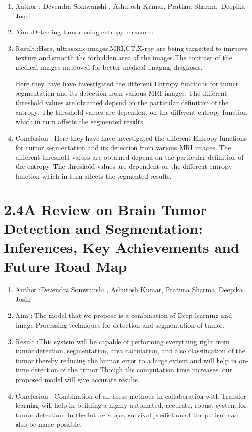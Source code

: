 \documentclass[oneside,a4paper,12pt]{book}
\begin{document}
\begin{enumerate}

\item Author : Devendra Somwanshi , Ashutosh Kumar, Pratima Sharma, Deepika Joshi

\item Aim :Detecting tumor using entropy measures
\item Result :Here, ultrasonic images,MRI,CT,X-ray are being targetted to imrpove texture and smooth the forbidden area of the images.The contrast of the medical images improved for better medical imaging diagnosis.\par Here they have have investigated the different Entropy functions for tumor segmentation and its detection from various MRI images. The different threshold values are obtained depend on the particular definition of the entropy. The threshold values are dependent on the different entropy function which in turn affects the segmented results.

\item Conclusion :  
Here they have have investigated the different Entropy functions for tumor segmentation and its detection from various MRI images. The different threshold values are obtained depend on the particular definition of the entropy. The threshold values are dependent on the different entropy function which in turn affects the segmented results.
\end{enumerate}

\newpage
\vspace{\baselineskip}\section*{2.4\hspace*{10pt}A Review on Brain Tumor Detection and Segmentation: Inferences, Key Achievements and Future Road Map }
\begin{enumerate}

\item Author :Devendra Somwanshi , Ashutosh Kumar, Pratima Sharma, Deepika Joshi
\item Aim : The model that we propose is a combination of Deep
learning and Image Processing techniques for detection
and segmentation of tumor.
\item Result :This system will be capable of performing
everything right from tumor detection, segmentation,
area calculation, and also classification of the tumor
thereby reducing the human error to a large extent and
will help in on-time detection of the tumor.Though the
computation time increases, our proposed model will
give accurate results.
\item Conclusion :  
Combination of all these methods in collaboration with
Transfer learning will help in building a highly
automated, accurate, robust system for tumor
detection.
In the future scope, survival
prediction of the patient can also be made possible.
\end{enumerate}
\end{document}
